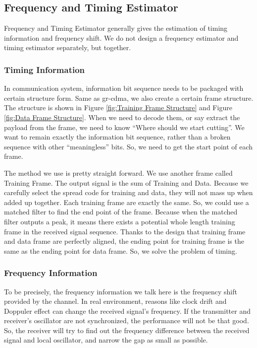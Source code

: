 \documentclass[a4paper]{report}
\begin{document}
\subsection{Frequency and Timing Estimator} %
\label{sub:frequency_and_timing_estimator}
Frequency and Timing Estimator generally gives the estimation of timing information and frequency shift. We do not design a frequency estimator and timing estimator separately, but together. 
\subsubsection{Timing Information} %
\label{ssub:timing_information}

In communication system, information bit sequence needs to be packaged with certain structure form. Same as gr-cdma, we also create a certain frame structure. The structure is shown in Figure \ref{fig:Training Frame Structure} and Figure \ref{fig:Data Frame Structure}. When we need to decode them, or say extract the payload from the frame, we need to know ``Where should we start cutting''. We want to remain exactly the information bit sequence, rather than a broken sequence with other ``meaningless'' bits. So, we need to get the start point of each frame. 

The method we use is pretty straight forward. We use another frame called Training Frame. The output signal is the sum of Training and Data. Because we carefully select the spread code for training and data, they will not mass up when added up together. Each training frame are exactly the same. So, we could use a matched filter to find the end point of the frame. Because when the matched filter outputs a peak, it means there exists a potential whole length training frame in the received signal sequence. Thanks to the design that training frame and data frame are perfectly aligned, the ending point for training frame is the same as the ending point for data frame. So, we solve the problem of timing.

\subsubsection{Frequency Information} %
\label{ssub:frequency_information}

To be precisely, the frequency information we talk here is the frequency shift provided by the channel. In real environment, reasons like clock drift and Doppuler effect can change the received signal's frequency. If the transmitter and receiver's oscillator are not synchronized, the performance will not be that good. So, the receiver will try to find out the frequency difference between the received signal and local oscillator, and narrow the gap as small as possible. 
\end{document}
